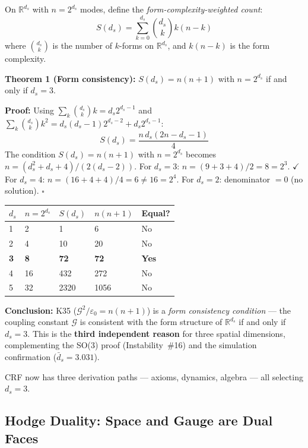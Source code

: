 \documentclass[12pt, a4paper]{article}
\begin{document}
\begin{derivedbox}[title={Theorem: $\sum_k\binom{d_s}{k}k(n-k) = n(n+1)$ iff $d_s=3$ (Algebraically Exact)}]
On $\mathbb{R}^{d_s}$ with $n = 2^{d_s}$ modes, define the
\emph{form-complexity-weighted count}:
\[
  S(d_s) = \sum_{k=0}^{d_s}\binom{d_s}{k}k(n-k)
\]
where $\binom{d_s}{k}$ is the number of $k$-forms on $\mathbb{R}^{d_s}$, and
$k(n-k)$ is the form complexity.

\textbf{Theorem 1 (Form consistency):} $S(d_s) = n(n+1)$ with $n = 2^{d_s}$ if and
only if $d_s = 3$.

\textbf{Proof:} Using $\sum_k\binom{d_s}{k}k = d_s 2^{d_s-1}$ and
$\sum_k\binom{d_s}{k}k^2 = d_s(d_s-1)2^{d_s-2}+d_s 2^{d_s-1}$:
\[
  S(d_s) = \frac{n\,d_s(2n-d_s-1)}{4}
\]
The condition $S(d_s) = n(n+1)$ with $n = 2^{d_s}$ becomes
$n = (d_s^2+d_s+4)/(2(d_s-2))$.
For $d_s=3$: $n=(9+3+4)/2=8=2^3$. $\checkmark$
For $d_s=4$: $n=(16+4+4)/4=6\neq 16=2^4$.
For $d_s=2$: denominator $=0$ (no solution). $\square$

\begin{center}
\renewcommand{\arraystretch}{1.2}
\begin{tabular}{p{0.7cm} p{1.5cm} p{1.8cm} p{1.8cm} p{1.5cm}}
\toprule
$d_s$ & $n=2^{d_s}$ & $S(d_s)$ & $n(n+1)$ & Equal? \\
\midrule
1 & 2 & 1 & 6 & No \\
2 & 4 & 10 & 20 & No \\
\textbf{3} & \textbf{8} & \textbf{72} & \textbf{72} & \textbf{Yes} \\
4 & 16 & 432 & 272 & No \\
5 & 32 & 2320 & 1056 & No \\
\bottomrule
\end{tabular}
\end{center}

\textbf{Conclusion:} K35 ($\mathcal{G}^2/\varepsilon_0 = n(n+1)$) is a
\emph{form consistency condition} --- the coupling constant $\mathcal{G}$ is
consistent with the form structure of $\mathbb{R}^{d_s}$ if and only if $d_s = 3$.
This is the \textbf{third independent reason} for three spatial dimensions,
complementing the SO(3) proof (Instability~\#16) and the simulation confirmation
($\bar{d}_s = 3.031$).

CRF now has three derivation paths --- axioms, dynamics, algebra --- all selecting $d_s=3$.
\end{derivedbox}

\subsection{Hodge Duality: Space and Gauge are Dual Faces}
\end{document}
